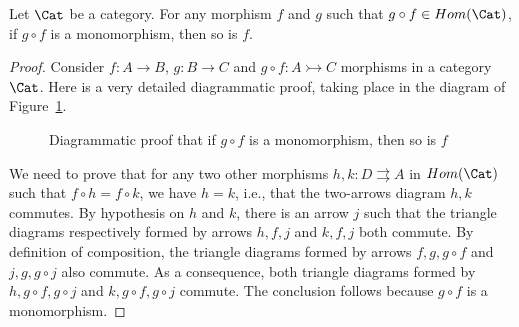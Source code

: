 \documentclass[a4paper,UKenglish,cleveref, autoref, thm-restate]{lipics-v2021}
\begin{document}
\begin{lemma}\label{lem:monomonom}
  Let $\Cat$ be a category. For any morphism $f$ and $g$ such that $g \circ f \in Hom(\Cat)$, if $g \circ f$ is a monomorphism, then so is $f$.
\end{lemma}

\begin{proof}
  Consider $f : A \rightarrow B$, $g : B \rightarrow C$ and $g \circ f : A \rightarrowtail C$ morphisms in a category $\Cat$. Here is a very detailed diagrammatic proof, taking place in the diagram of Figure~\ref{fig:monomonom}.

  \begin{figure}[h!]
    \begin{center}
    \end{center}
    \caption{Diagrammatic proof that if $g \circ f$ is a monomorphism, then so is $f$}\label{fig:monomonom}
  \end{figure}

  We need to prove that for any two other morphisms $h,k : D \rightrightarrows A$ in $Hom(\Cat)$ such that $f \circ h = f \circ k$, we have $h = k$, i.e., that the two-arrows diagram $h, k$ commutes. By hypothesis on $h$ and $k$, there is an arrow $j$ such that the triangle diagrams respectively formed by arrows $h,f, j$ and $k, f, j$ both commute. By definition of composition, the triangle diagrams formed by arrows $f, g, g \circ f$ and $j, g, g \circ j$ also commute. As a consequence, both triangle diagrams formed by $h, g \circ f, g \circ j$ and $k, g \circ f, g \circ j$ commute. The conclusion follows because $g \circ f$ is a monomorphism.
\end{proof}
\end{document}
